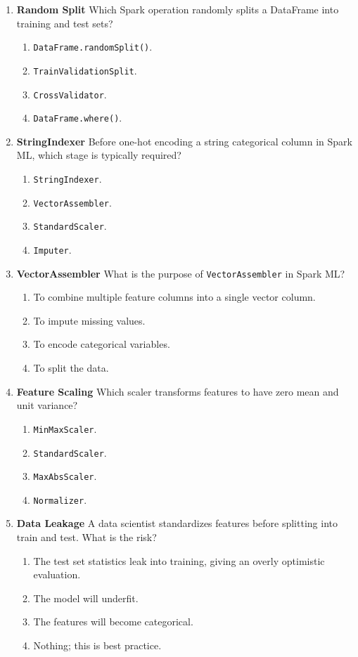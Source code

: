 \documentclass{article}
\begin{document}
\begin{enumerate}[label=\textbf{Q\arabic*.}]
		\item \textbf{Random Split}
		Which Spark operation randomly splits a DataFrame into training and test sets?
		\begin{enumerate}[label=\Alph*.]
			\item \texttt{DataFrame.randomSplit()}.
			\item \texttt{TrainValidationSplit}.
			\item \texttt{CrossValidator}.
			\item \texttt{DataFrame.where()}.
		\end{enumerate}
		
		\item \textbf{StringIndexer}
		Before one-hot encoding a string categorical column in Spark ML, which stage is typically required?
		\begin{enumerate}[label=\Alph*.]
			\item \texttt{StringIndexer}.
			\item \texttt{VectorAssembler}.
			\item \texttt{StandardScaler}.
			\item \texttt{Imputer}.
		\end{enumerate}
		
		\item \textbf{VectorAssembler}
		What is the purpose of \texttt{VectorAssembler} in Spark ML?
		\begin{enumerate}[label=\Alph*.]
			\item To combine multiple feature columns into a single vector column.
			\item To impute missing values.
			\item To encode categorical variables.
			\item To split the data.
		\end{enumerate}
		
		\item \textbf{Feature Scaling}
		Which scaler transforms features to have zero mean and unit variance?
		\begin{enumerate}[label=\Alph*.]
			\item \texttt{MinMaxScaler}.
			\item \texttt{StandardScaler}.
			\item \texttt{MaxAbsScaler}.
			\item \texttt{Normalizer}.
		\end{enumerate}
		
		\item \textbf{Data Leakage}
		A data scientist standardizes features before splitting into train and test. What is the risk?
		\begin{enumerate}[label=\Alph*.]
			\item The test set statistics leak into training, giving an overly optimistic evaluation.
			\item The model will underfit.
			\item The features will become categorical.
			\item Nothing; this is best practice.
		\end{enumerate}
		

\end{enumerate}
\end{document}
